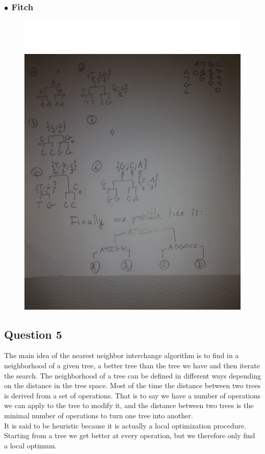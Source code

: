 \documentclass[]{article}
\theoremstyle{definition}
\begin{document}
\subsubsection*{$\bullet$ Fitch }

\begin{figure}[h!]
	\includegraphics*[width = \linewidth]{image/Fitch.jpg}
\end{figure}

\subsection{Question 5}
The main idea of the nearest neighbor interchange algorithm is to find in a neighborhood of a given tree, a better tree than the tree we have and then iterate the search. The neighborhood of a tree can be defined in different ways depending on the distance in the tree space. Most of the time the distance between two trees is derived from a set of operations. That is to say we have a number of operations we can apply to the tree to modify it, and the distance between two trees is the minimal number of operations to turn one tree into another.\\
It is said to be heuristic because it is actually a local optimization procedure. Starting from a tree we get better at every operation, but we therefore only find a local optimum.
\end{document}
